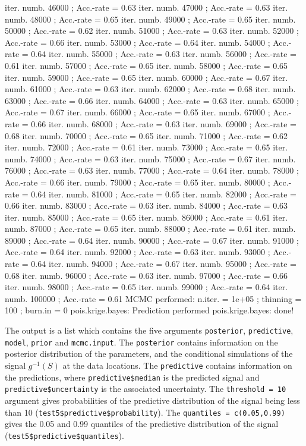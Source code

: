 \documentclass[12pt,a4paper]{article}
\newcommand{\code}[1]{\texttt{\small #1}}
\begin{document}
\begin{Schunk}
\begin{Soutput}
iter. numb. 46000 ; Acc.-rate = 0.63 
iter. numb. 47000 ; Acc.-rate = 0.63 
iter. numb. 48000 ; Acc.-rate = 0.65 
iter. numb. 49000 ; Acc.-rate = 0.65 
iter. numb. 50000 ; Acc.-rate = 0.62 
iter. numb. 51000 ; Acc.-rate = 0.63 
iter. numb. 52000 ; Acc.-rate = 0.66 
iter. numb. 53000 ; Acc.-rate = 0.64 
iter. numb. 54000 ; Acc.-rate = 0.64 
iter. numb. 55000 ; Acc.-rate = 0.63 
iter. numb. 56000 ; Acc.-rate = 0.61 
iter. numb. 57000 ; Acc.-rate = 0.65 
iter. numb. 58000 ; Acc.-rate = 0.65 
iter. numb. 59000 ; Acc.-rate = 0.65 
iter. numb. 60000 ; Acc.-rate = 0.67 
iter. numb. 61000 ; Acc.-rate = 0.63 
iter. numb. 62000 ; Acc.-rate = 0.68 
iter. numb. 63000 ; Acc.-rate = 0.66 
iter. numb. 64000 ; Acc.-rate = 0.63 
iter. numb. 65000 ; Acc.-rate = 0.67 
iter. numb. 66000 ; Acc.-rate = 0.65 
iter. numb. 67000 ; Acc.-rate = 0.66 
iter. numb. 68000 ; Acc.-rate = 0.63 
iter. numb. 69000 ; Acc.-rate = 0.68 
iter. numb. 70000 ; Acc.-rate = 0.65 
iter. numb. 71000 ; Acc.-rate = 0.62 
iter. numb. 72000 ; Acc.-rate = 0.61 
iter. numb. 73000 ; Acc.-rate = 0.65 
iter. numb. 74000 ; Acc.-rate = 0.63 
iter. numb. 75000 ; Acc.-rate = 0.67 
iter. numb. 76000 ; Acc.-rate = 0.63 
iter. numb. 77000 ; Acc.-rate = 0.64 
iter. numb. 78000 ; Acc.-rate = 0.66 
iter. numb. 79000 ; Acc.-rate = 0.65 
iter. numb. 80000 ; Acc.-rate = 0.64 
iter. numb. 81000 ; Acc.-rate = 0.65 
iter. numb. 82000 ; Acc.-rate = 0.66 
iter. numb. 83000 ; Acc.-rate = 0.63 
iter. numb. 84000 ; Acc.-rate = 0.63 
iter. numb. 85000 ; Acc.-rate = 0.65 
iter. numb. 86000 ; Acc.-rate = 0.61 
iter. numb. 87000 ; Acc.-rate = 0.65 
iter. numb. 88000 ; Acc.-rate = 0.61 
iter. numb. 89000 ; Acc.-rate = 0.64 
iter. numb. 90000 ; Acc.-rate = 0.67 
iter. numb. 91000 ; Acc.-rate = 0.64 
iter. numb. 92000 ; Acc.-rate = 0.63 
iter. numb. 93000 ; Acc.-rate = 0.64 
iter. numb. 94000 ; Acc.-rate = 0.67 
iter. numb. 95000 ; Acc.-rate = 0.68 
iter. numb. 96000 ; Acc.-rate = 0.63 
iter. numb. 97000 ; Acc.-rate = 0.66 
iter. numb. 98000 ; Acc.-rate = 0.65 
iter. numb. 99000 ; Acc.-rate = 0.64 
iter. numb. 100000 ; Acc.-rate = 0.61 
MCMC performed: n.iter. =  1e+05 ; thinning =  100 ; burn.in =  0 
pois.krige.bayes: Prediction performed 
pois.krige.bayes: done!
\end{Soutput}
\end{Schunk}

The output is a list which contains the five arguments \code{posterior}, \code{predictive}, \code{model}, \code{prior} and \code{mcmc.input}. 
The \code{posterior} contains information
on the posterior distribution of the parameters, and the conditional simulations of the signal 
$g^{-1}(S)$ at the data locations. 
The \code{predictive} contains information on the predictions, where 
\code{predictive\$median} is the predicted signal and \code{predictive\$uncertainty} is the associated uncertainty.
The \code{threshold = 10} argument gives probabilities of the predictive distribution of the signal being less 
than 10 (\code{test5\$predictive\$probability}).
The \code{quantiles = c(0.05,0.99)} gives the 0.05 and 0.99 quantiles of the predictive distribution of the signal 
(\code{test5\$predictive\$quantiles}).
\end{document}
